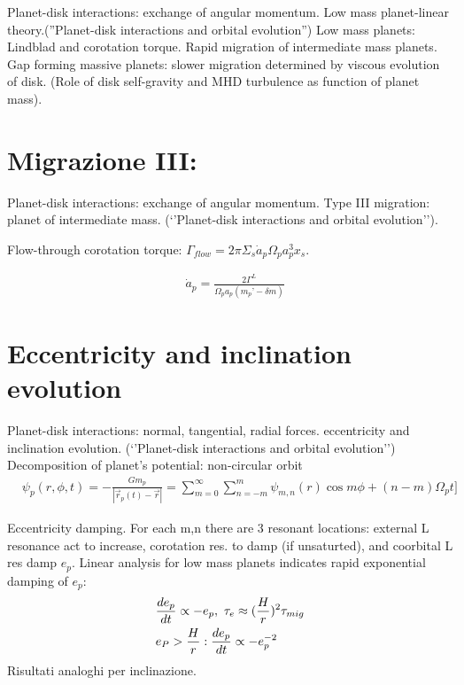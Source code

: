 Planet-disk interactions: exchange of angular momentum. Low mass planet-linear theory.(''Planet-disk interactions and orbital evolution'')
Low mass planets: Lindblad and corotation torque. Rapid migration of intermediate mass planets. Gap forming massive planets: slower migration determined by viscous evolution of disk. (Role of disk self-gravity and MHD turbulence as function of planet mass).


\section{Migrazione III:}
Planet-disk interactions: exchange of angular momentum. Type III migration: planet of intermediate mass. (‘’Planet-disk interactions and orbital evolution’’).

Flow-through corotation torque: $\Gamma_{flow}=2\pi\Sigma_s\dot{a}_p\Omega_pa_p^3x_s$.

\begin{align*}
&\dot{a}_p=\frac{2\Gamma^L}{\Omega_pa_p(m_p’-\delta m)}
\end{align*}

\section{Eccentricity and inclination evolution}
Planet-disk interactions: normal, tangential, radial forces. eccentricity and inclination evolution. (‘’Planet-disk interactions and orbital evolution’’)
Decomposition of planet’s potential: non-circular orbit
\begin{align*}
&\psi_p(r,\phi,t)=-\frac{Gm_p}{|\vec{r}_p(t)-\vec{r}|}=\sum_{m=0}^{\infty}\sum_{n=-m}^m\psi_{m,n}(r)\cos{m\phi+(n-m)\Omega_pt]}
\end{align*}

Eccentricity damping.
For each m,n there are 3 resonant locations: external L resonance act to increase, corotation res. to damp (if unsaturted), and coorbital L res damp $e_p$. Linear analysis for low mass planets indicates rapid exponential damping of $e_p$:
\begin{align*}
&\TDy{t}{e_p}\propto-e_p,\ \tau_e\approx(\frac{H}{r})^2\tau_{mig}\\
&e_P>\frac{H}{r}: \TDy{t}{e_p}\propto-e_p\expy{-2}
\end{align*}
Risultati analoghi per inclinazione.
